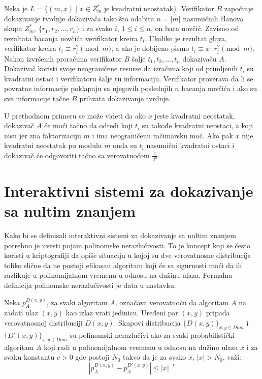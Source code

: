\begin{npra}
	\label{IntbezZK}
	Neka je $L=\{(m,x) \;|\; x\in Z^{*}_{m}\; \mathrm{ je}\; \mathrm{kvadratni}\; \mathrm{neostatak}\}$. Verifikator $B$ započinje dokazivanje tvrdnje dokazivača tako što odabira $n = |m|$ nasumičnih članova skupa $Z^{*}_{m}$, $\{r_{1},r_{2},...,r_{n}\}$ i  za svako $i$, $1\leq i\leq n$, on baca novčić. Zavisno od rezultata bacanja novčića verifikator kreira $t_{i}$. Ukoliko je rezultat glava, verifikator kreira $t_{i} \equiv r_{i}^{2} \pmod m$, a ako je dobijeno pismo $t_{i} \equiv x \cdot r_{i}^{2} \pmod m$. Nakon izvršenih proračuna verifikator $B$ šalje $t_{1}, t_{2},...,t_{n}$ dokazivaču $A$. Dokazivač koristi svoje neograničene resurse da izračuna koji od primljenih $t_{i}$ su kvadratni ostaci i verifikatoru šalje tu informaciju. Verifikator proverava da li se povratne informacije poklapaju sa njegovih poslednjih $n$ bacanja novčića i ako su sve informacije tačne $B$ prihvata dokazivanje tvrdnje.
\end{npra}

U prethodnom primeru se mo\v ze videti da ako $x$ jeste kvadratni neostatak, dokazivač $A$ će moći tačno da odredi koji $t_{i}$ su takođe kvadratni neostaci, a koji nisu jer zna faktorizaciju $m$ i ima neograničenu računarsku moć. Ako pak $x$ nije kvadratni neostatak po modulu $m$ onda su $t_{i}$ nasumični kvadratni ostaci i dokazivač će odgovoriti tačno sa verovatnoćom $\frac{1}{2^{n}}$.

\section{Interaktivni sistemi za dokazivanje sa nultim znanjem}
Kako bi se definisali interaktivni sistemi za dokazivanje sa nultim znanjem potrebno je uvesti pojam polinomske nerazlučivosti. To je koncept koji se često koristi u kriptografiji da opiše situaciju u kojoj su dve verovatnosne distribucije toliko slične da ne postoji efikasan algoritam koji će sa sigurnosti moći da ih razlikuje u polinomijalnom vremenu u odnosu na dužinu ulaza. Formalna definicija polinomske nerazlučivosti je data u nastavku\cite{intSZKdef}. 
\begin{definition}
	Neka $p_{A}^{D(x,y)}$, za svaki algoritam $A$,  označava verovatnoću da algoritam $A$ na zadati ulaz $(x,y)$ kao izlaz vrati jedinicu. Uređeni par $(x,y)$ pripada verovatnosnoj distribuciji $D(x,y)$. Skupovi distribucija $\{D(x,y)\}_{x;y \in Dom}$ i $\{D'(x,y)\}_{x;y \in Dom}$ su polinomski nerazlučivi ako za svaki probabilistički algoritam $A$ koji radi u polinomijalnom vremenu u odnosu na dužinu ulaza $x$ i za svaku konstantu $c>0$ gde postoji $N_{0}$ takvo da je za svako $x$, $|x| > N_{0}$, važi:
	$$|p_{A}^{D(x,y)} - p_{A}^{D'(x,y)}| \leq |x|^{-c}$$
\end{definition}

